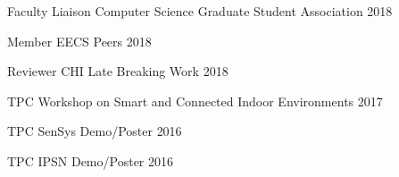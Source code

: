 
\begin{cvhonors}

  \cvhonor
    {Faculty Liaison}
    {Computer Science Graduate Student Association}
    {} %
    {2018}

  \cvhonor
    {Member}
    {EECS Peers}
    {} %
    {2018}

  \cvhonor
    {Reviewer}
    {CHI Late Breaking Work}
    {}
    {2018}

  \cvhonor
    {TPC}
    {Workshop on Smart and Connected Indoor Environments}
    {}
    {2017}

  \cvhonor
    {TPC}
    {SenSys Demo/Poster}
    {}
    {2016}

  \cvhonor
    {TPC}
    {IPSN Demo/Poster}
    {}
    {2016}

\end{cvhonors}

